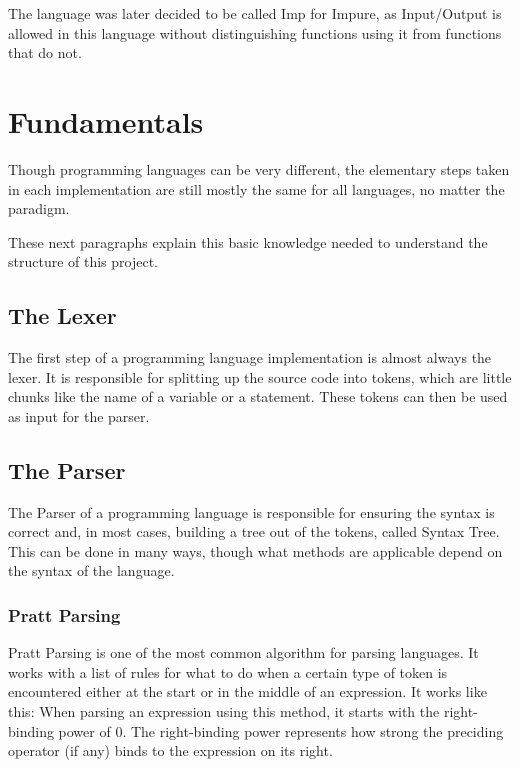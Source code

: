 \documentclass[12pt]{article}
\begin{document}
The language was later decided to be called Imp for Impure,
as Input/Output is allowed in this language
without distinguishing functions using it from functions that do not.

\section{Fundamentals}
Though programming languages can be very different,
the elementary steps taken in each implementation are
still mostly the same for all languages, no matter the paradigm.

These next paragraphs explain this basic knowledge needed
to understand the structure of this project.

\subsection{The Lexer}
The first step of a programming language implementation is almost always the lexer.
It is responsible for splitting up the source code into tokens,
which are little chunks like the name of a variable or a statement.
These tokens can then be used as input for the parser.

\subsection{The Parser}
The Parser of a programming language is responsible for ensuring the syntax is correct and, in most cases,
building a tree out of the tokens, called Syntax Tree.
This can be done in many ways, though what methods are applicable
depend on the syntax of the language.
\subsubsection{Pratt Parsing}
Pratt Parsing \autocite{prattTopOperatorPrecedence1973}
is one of the most common algorithm for parsing languages.
It works with a list of rules for what to do when a certain type of token is encountered
either at the start or in the middle of an expression.
It works like this:
When parsing an expression using this method,
it starts with the right-binding power of 0.
The right-binding power represents how strong
the preciding operator (if any) binds to the expression
on its right.
\end{document}
